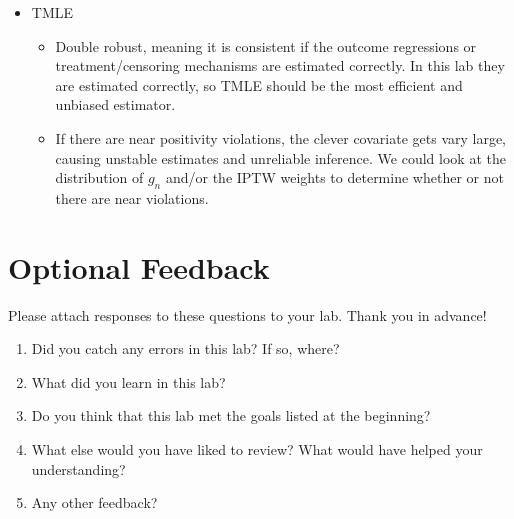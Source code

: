 \documentclass{exam}
\begin{document}
\begin{solution}
\begin{itemize}
\begin{itemize}
\end{itemize}
\item TMLE
\begin{itemize}
\item Double robust, meaning it is consistent if the outcome regressions or treatment/censoring mechanisms are estimated correctly. In this lab they are estimated correctly, so TMLE should be the most efficient and unbiased estimator. 
\item If there are near positivity violations, the clever covariate gets vary large, causing unstable estimates and unreliable inference. We could look at the distribution of  $g_n$ and/or the IPTW weights to determine whether or not there are near violations. 
\end{itemize}
\end{itemize}



\end{solution}




\pagebreak
\section{Optional Feedback}

Please attach responses to these questions to your lab. Thank you in advance!

\begin{enumerate}
\item Did you catch any errors in this lab? If so, where?
\item What did you learn in this lab?
\item Do you think that this lab met the goals listed at the beginning? 
\item What else would you have liked to review? What would have helped your understanding?
\item Any other feedback?
\end{enumerate}
\end{document}
